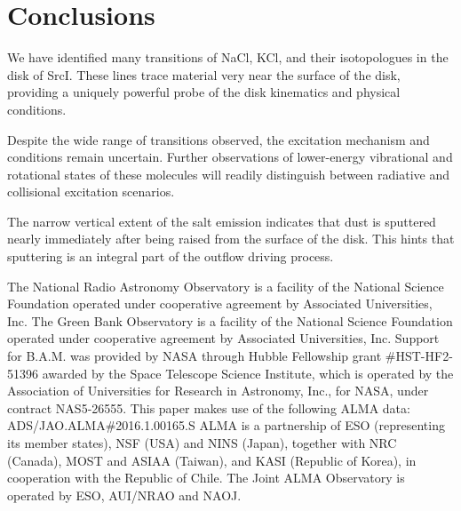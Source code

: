 \documentclass[twocolumn]{aastex62}
\newcommand{\sourcei}{SrcI\xspace}
\begin{document}








\section{Conclusions}
We have identified many transitions of NaCl, KCl, and their isotopologues in
the disk of \sourcei.  These lines trace material very near the surface of the
disk, providing a uniquely powerful probe of the disk kinematics and physical
conditions.

Despite the wide range of transitions observed, the excitation mechanism and
conditions remain uncertain.  Further observations of lower-energy vibrational
and rotational states of these molecules will readily distinguish between
radiative and collisional excitation scenarios.

The narrow vertical extent of the salt emission indicates that dust is sputtered
nearly immediately after being raised from the surface of the disk.  This hints
that sputtering is an integral part of the outflow driving process.


\acknowledgements
The National Radio Astronomy Observatory is a facility of the National Science
Foundation operated under cooperative agreement by Associated Universities,
Inc. The Green Bank Observatory is a facility of the National Science
Foundation operated under cooperative agreement by Associated Universities,
Inc. Support for B.A.M. was provided by NASA through Hubble Fellowship grant
\#HST-HF2-51396 awarded by the Space Telescope Science Institute, which is
operated by the Association of Universities for Research in Astronomy, Inc.,
for NASA, under contract NAS5-26555. 
This paper makes use of the following ALMA data: ADS/JAO.ALMA\#2016.1.00165.S
ALMA is a partnership of ESO (representing its member states), NSF (USA) and
NINS (Japan), together with NRC (Canada), MOST and ASIAA (Taiwan), and KASI
(Republic of Korea), in cooperation with the Republic of Chile. The Joint ALMA
Observatory is operated by ESO, AUI/NRAO and NAOJ.


\end{document}
